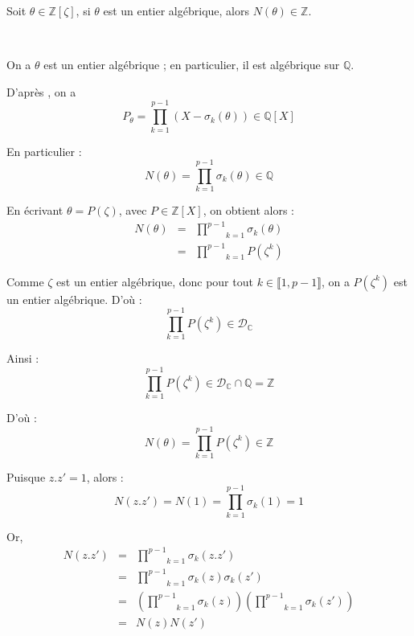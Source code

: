 
Soit $\theta \in \mathbb{Z} [\zeta]$, si $\theta$ est un entier
alg{\'e}brique, alors $N (\theta) \in \mathbb{Z}$.

\


On a $\theta$ est un entier alg{\'e}brique ; en particulier, il est
alg{\'e}brique sur $\mathbb{Q}$.

D'apr{\`e}s , on a
\[ P_{\theta} = \underset{k = 1}{\overset{p - 1}{\prod}} (X - \sigma_k
   (\theta)) \in \mathbb{Q} [X] \]


En particulier :
\[ N (\theta) = \underset{k = 1}{\overset{p - 1}{\prod}} \sigma_k (\theta) \in
   \mathbb{Q} \]


En {\'e}crivant $\theta = P (\zeta)$, avec $P \in \mathbb{Z} [X]$, on obtient
alors :
\begin{eqnarray*}
  N (\theta) & = & \underset{k = 1}{\overset{p - 1}{\prod}} \sigma_k
  (\theta)\\
  & = & \underset{k = 1}{\overset{p - 1}{\prod}} P (\zeta^k)
\end{eqnarray*}


Comme $\zeta$ est un entier alg{\'e}brique, donc pour tout $k \in \llbracket
1, p - 1 \rrbracket$, on a $P (\zeta^k)$ est un entier alg{\'e}brique.
D'o{\`u} :
\[ \underset{k = 1}{\overset{p - 1}{\prod}} P (\zeta^k) \in
   \mathcal{D}_{\mathbb{C}} \]


Ainsi :
\[ \underset{k = 1}{\overset{p - 1}{\prod}} P (\zeta^k) \in
   \mathcal{D}_{\mathbb{C}} \cap \mathbb{Q}=\mathbb{Z} \]


D'o{\`u} :
\[ N (\theta) = \underset{k = 1}{\overset{p - 1}{\prod}} P (\zeta^k) \in
   \mathbb{Z} \]


Puisque $z.z' = 1$, alors :
\[ N (z.z') = N (1) = \underset{k = 1}{\overset{p - 1}{\prod}} \sigma_k (1) =
   1 \]


Or,
\begin{eqnarray*}
  N (z.z') & = & \underset{k = 1}{\overset{p - 1}{\prod}} \sigma_k (z.z')\\
  & = & \underset{k = 1}{\overset{p - 1}{\prod}} \sigma_k (z) \sigma_k (z')\\
  & = & \left( \underset{k = 1}{\overset{p - 1}{\prod}} \sigma_k (z) \right)
  \left( \underset{k = 1}{\overset{p - 1}{\prod}} \sigma_k (z') \right)\\
  & = & N (z) N (z')
\end{eqnarray*}


